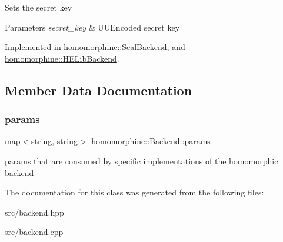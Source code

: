 Sets the secret key


\begin{DoxyParams}{Parameters}
{\em secret\+\_\+key} & U\+U\+Encoded secret key \\
\hline
\end{DoxyParams}


Implemented in \mbox{\hyperlink{classhomomorphine_1_1_seal_backend_aa9fd3331b2c710e8fdfc3385bbf11eb5}{homomorphine\+::\+Seal\+Backend}}, and \mbox{\hyperlink{classhomomorphine_1_1_h_e_lib_backend_a483a6695be2d733d48e2180ffb25d053}{homomorphine\+::\+H\+E\+Lib\+Backend}}.



\subsection{Member Data Documentation}
\mbox{\label{classhomomorphine_1_1_backend_a008e8becd641dcb9ebebd94a91e67a1b}} 
\subsubsection{\texorpdfstring{params}{params}}
{\footnotesize\ttfamily map$<$string, string$>$ homomorphine\+::\+Backend\+::params\hspace{0.3cm}{\ttfamily [protected]}}

params that are consumed by specific implementations of the homomorphic backend 

The documentation for this class was generated from the following files\+:\begin{DoxyCompactItemize}
\item 
src/backend.\+hpp\item 
src/backend.\+cpp\end{DoxyCompactItemize}
